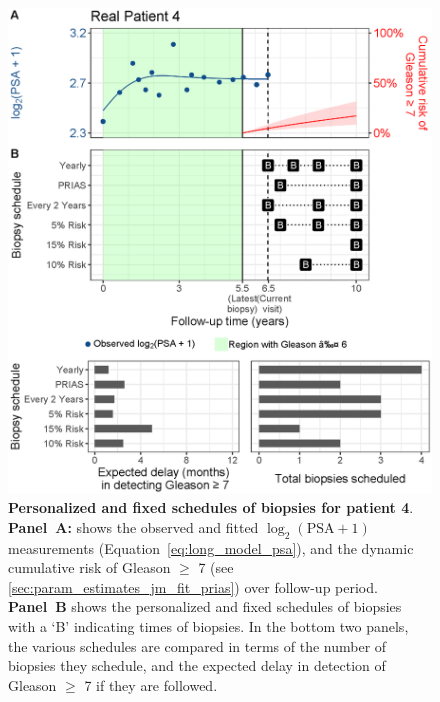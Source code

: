 \begin{figure}
\centerline{\includegraphics[width=\columnwidth]{images/demo_pat4_supp.eps}}
\caption{\textbf{Personalized and fixed schedules of biopsies for patient 4}. \textbf{Panel~A:} shows the observed and fitted $\log_2(\mbox{PSA} + 1)$ measurements (Equation~\ref{eq:long_model_psa}), and the dynamic cumulative risk of Gleason $\geq$ 7 (see \ref{sec:param_estimates_jm_fit_prias}) over follow-up period. \textbf{Panel~B} shows the personalized and fixed schedules of biopsies with a `B' indicating times of biopsies. In the bottom two panels, the various schedules are compared in terms of the number of biopsies they schedule, and the expected delay in detection of Gleason $\geq$ 7 if they are followed.}
\label{fig:demo_pat4_supp}
\end{figure}